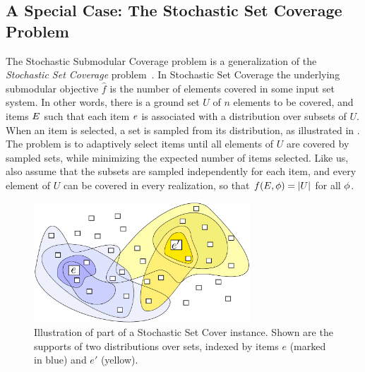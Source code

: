 \subsection{A Special Case: The Stochastic Set Coverage Problem}
The Stochastic Submodular Coverage problem is a generalization of the 
\emph{Stochastic Set Coverage} problem~\citep{goemans06stochastic}. 
In Stochastic Set Coverage the underlying
submodular objective $\hat{f}$ is the number of elements covered in
some input set system.  In other words, there is a ground set $U$ of
$n$ elements to be covered, and items $E$ such that each item
$e$ is associated with a distribution over subsets of $U$.  When
an item is selected, a set is sampled from its distribution, as
illustrated in .  The
problem is to adaptively select items until all elements of $U$
are covered by sampled sets, 
while minimizing the expected number of items selected.
Like us, 
\citeauthor{goemans06stochastic} also assume that 
the subsets are sampled independently for each item,  
and every element of $U$ can
be covered in every realization, so that $f(E, {\color{black}{\ensuremath{\phi}}}) =
|U|$ for all ${\color{black}{\ensuremath{\phi}}}$.

 \begin{figure}%
 \centering 
 \includegraphics[height=4.5cm]{figs/stocSetCover}
 \caption{Illustration of part of a Stochastic Set Cover instance.  Shown are
   the supports of two distributions over sets, indexed by items $e$ (marked in blue) and $e'$ (yellow).   \label{fig:stocsetcover}}
 \end{figure} 

